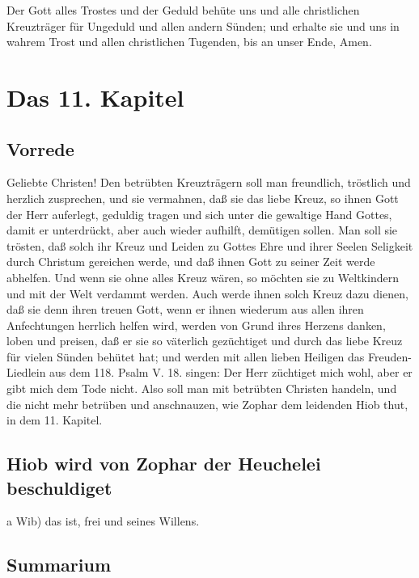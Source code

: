 Der Gott alles Trostes und der Geduld behüte uns und alle christlichen Kreuzträger für Ungeduld und allen andern Sünden; und erhalte sie und uns in wahrem Trost und allen christlichen Tugenden, bis an unser Ende, Amen.

\chapter{Das 11. Kapitel}

\section{Vorrede}

Geliebte Christen! Den betrübten Kreuzträgern soll man freundlich, tröstlich und herzlich zusprechen, und sie vermahnen, daß sie das liebe Kreuz, so ihnen Gott der Herr auferlegt, geduldig tragen und sich unter die gewaltige Hand Gottes, damit er unterdrückt, aber auch wieder aufhilft, demütigen sollen. Man soll sie trösten, daß solch ihr Kreuz und Leiden zu Gottes Ehre und ihrer Seelen Seligkeit durch Christum gereichen werde, und daß ihnen Gott zu seiner Zeit werde abhelfen. Und wenn sie ohne alles Kreuz wären, so möchten sie zu Weltkindern und mit der Welt verdammt werden. Auch werde ihnen solch Kreuz dazu dienen, daß sie denn ihren treuen Gott, wenn er ihnen wiederum aus allen ihren Anfechtungen herrlich helfen wird, werden von Grund ihres Herzens danken, loben und preisen, daß er sie so väterlich gezüchtiget und durch das liebe Kreuz für vielen Sünden behütet hat; und werden mit allen
lieben Heiligen das Freuden-Liedlein aus dem 118. Psalm V. 18. singen: Der Herr züchtiget mich wohl, aber er gibt mich dem Tode nicht. Also soll man mit betrübten Christen handeln, und die nicht mehr betrüben und anschnauzen, wie Zophar dem leidenden Hiob thut, in dem 11. Kapitel.

\section{Hiob wird von Zophar der Heuchelei beschuldiget}

a Wib) das ist, frei und seines Willens.

\section{Summarium}


